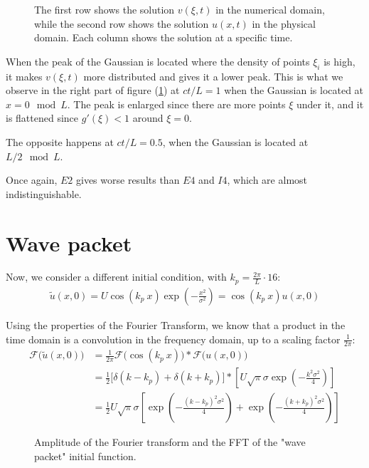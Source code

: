 \documentclass[11 pt]{article}
\begin{document}
\begin{figure}[H]
    \centering
    
    \caption{The first row shows the solution $v(\xi, t)$ in the numerical domain, while the second row shows the solution $u(x,t)$ in the physical domain. Each column shows the solution at a specific time.}
    \label{fig:nonuniform}
\end{figure}

When the peak of the Gaussian is located where the density of points $\xi_i$ is high, it makes $v(\xi, t)$ more distributed and gives it a lower peak. This is what we observe in the right part of figure (\ref{fig:nonuniform}) at $ct/L=1$ when the Gaussian is located at $x=0 \mod L$. The peak is enlarged since there are more points $\xi$ under it, and it is flattened since $g'(\xi)<1$ around $\xi = 0$.

The opposite happens at $ct/L=0.5$, when the Gaussian is located at $L/2 \mod L$.

Once again, $E2$ gives worse results than $E4$ and $I4$, which are almost indistinguishable.

\section{Wave packet}
Now, we consider a different initial condition, with $k_p=\frac{2\pi}{L} \cdot 16$:
\begin{align*}
    \tilde u(x,0) = U \cos{(k_p\: x)} \exp\left(-\frac{x^2}{\sigma^2}\right) = \cos{(k_p\: x)} u(x,0)
\end{align*}

Using the properties of the Fourier Transform, we know that a product in the time domain is a convolution in the frequency domain, up to a scaling factor $\frac{1}{2\pi}$:
\begin{align*}
    \mathcal{F}\big(\tilde u(x,0)\big) &= \frac{1}{2\pi} \mathcal{F}\big(\cos{(k_p \: x)}\big) * \mathcal{F}\big(u(x,0)\big)\\
    &= \frac{1}{2} \bigg[\delta(k-k_p) + \delta(k+k_p)\bigg] * \left[U \sqrt{\pi} \sigma \exp\left(-\frac{k^2\sigma^2}{4}\right)\right]\\
    &= \frac{1}{2} U \sqrt{\pi} \sigma \left[\exp\left(-\frac{(k-k_p)^2\sigma^2}{4}\right) + \exp\left(-\frac{(k+k_p)^2\sigma^2}{4}\right)\right]
\end{align*}

\begin{figure}[H]
    \centering
    
    \caption{Amplitude of the Fourier transform and the FFT of the "wave packet" initial function.}
    \label{fig:fourier_wave_packet}
\end{figure}
\end{document}
